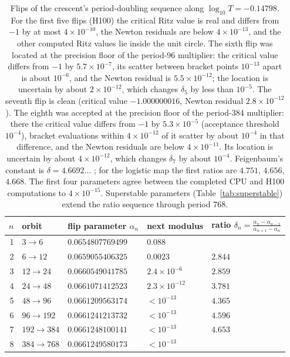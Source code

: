 \documentclass[11pt,letterpaper]{article}
\begin{document}
\begin{table}[H]
\centering\small
\begin{tabular}{rllll}
\toprule
$n$ & orbit & flip parameter $\alpha_n$ & next modulus & ratio $\delta_n=\frac{\alpha_n-\alpha_{n-1}}{\alpha_{n+1}-\alpha_n}$ \\
\midrule
1 & $3\to6$ & $0.0654807769499$ & $0.088$ & \\
2 & $6\to12$ & $0.0659055406325$ & $0.0023$ & $2.844$ \\
3 & $12\to24$ & $0.0660549041785$ & $2.4\times10^{-6}$ & $2.859$ \\
4 & $24\to48$ & $0.0661071412523$ & $2.3\times10^{-12}$ & $3.781$ \\
5 & $48\to96$ & $0.0661209563174$ & $<10^{-13}$ & $4.365$ \\
6 & $96\to192$ & $0.0661241213732$ & $<10^{-13}$ & $4.596$ \\
7 & $192\to384$ & $0.0661248100141$ & $<10^{-13}$ & $4.653$ \\
8 & $384\to768$ & $0.0661249580173$ & $<10^{-13}$ & \\
\bottomrule
\end{tabular}
\caption{Flips of the crescent's period-doubling sequence along $\log_{10}T=-0.14798$. For the first five flips (H100) the
critical Ritz value is real and differs from $-1$ by at most $4\times10^{-10}$, the Newton residuals are below
$4\times10^{-13}$, and the other computed Ritz values lie inside the unit circle. The sixth flip was located at the
precision floor of the period-96 multiplier: the critical value differs from $-1$ by $5.7\times10^{-7}$, its scatter
between bracket points $10^{-13}$ apart is about $10^{-6}$, and the Newton residual is $5.5\times10^{-12}$; the
location is uncertain by about $2\times10^{-12}$, which changes $\delta_5$ by less than $10^{-5}$. The seventh flip is
clean (critical value $-1.000000016$, Newton residual $2.8\times10^{-12}$). The eighth was accepted at the precision
floor of the period-384 multiplier: there the critical value differs from $-1$ by $5.3\times10^{-5}$ (acceptance
threshold $10^{-4}$), bracket evaluations within $4\times10^{-12}$ of it scatter by about $10^{-4}$ in that difference,
and the Newton residuals are below $4\times10^{-11}$. Its location is uncertain by about $4\times10^{-12}$, which
changes $\delta_7$ by about $10^{-4}$. Feigenbaum's constant is
$\delta=4.6692\ldots$ \cite{feigenbaum1978quantitative}; for the logistic map the first ratios are $4.751$, $4.656$,
$4.668$.
The first four parameters agree between the completed CPU and H100 computations to $4\times10^{-15}$. Superstable parameters (Table~\ref{tab:superstable}) extend the ratio
sequence through period 768.}
\label{tab:cascade}
\end{table}
\end{document}
